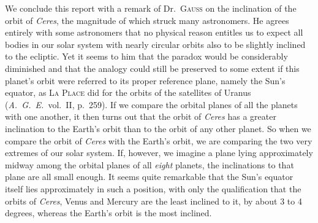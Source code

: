 %
We conclude this report with a remark of Dr.\ \textsc{Gauss} on the inclination of the orbit of \textit{Ceres}, the magnitude of which struck many astronomers. He agrees entirely with some astronomers that no physical reason entitles us to expect all bodies in our solar system with nearly circular orbits also to be slightly inclined to the ecliptic. Yet it seems to him that the paradox would be considerably diminished and that the analogy could still be preserved to some extent if this planet's orbit were referred to its proper reference plane, namely the Sun's equator, as \textsc{La Place} did for the orbits of the satellites of Uranus (\textit{A.\ G.\ E.}\ vol.\ II, p.\ 259). If we compare the orbital planes of all the planets with one another, it then turns out that the orbit of \textit{Ceres} has a greater inclination to the Earth's orbit than to the orbit of any other planet. So when we compare the orbit of \textit{Ceres} with the Earth's orbit, we are comparing the two very extremes of our solar system. If, however, we imagine a plane lying approximately midway among the orbital planes of all \textit{eight} planets, the inclinations to that plane are all small enough. It seems quite remarkable that the Sun's equator itself lies approximately in such a position, with only the qualification that the orbits of \textit{Ceres}, Venus and Mercury are the least inclined to it, by about 3 to 4 degrees, whereas the Earth's orbit is the most inclined.
\begin{flushright}\end{flushright}


